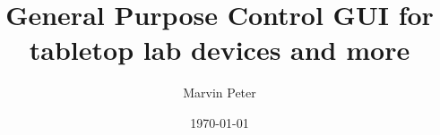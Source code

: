 
\title{General Purpose Control GUI for tabletop lab devices and more}
\author{Marvin Peter}
\date{\today}